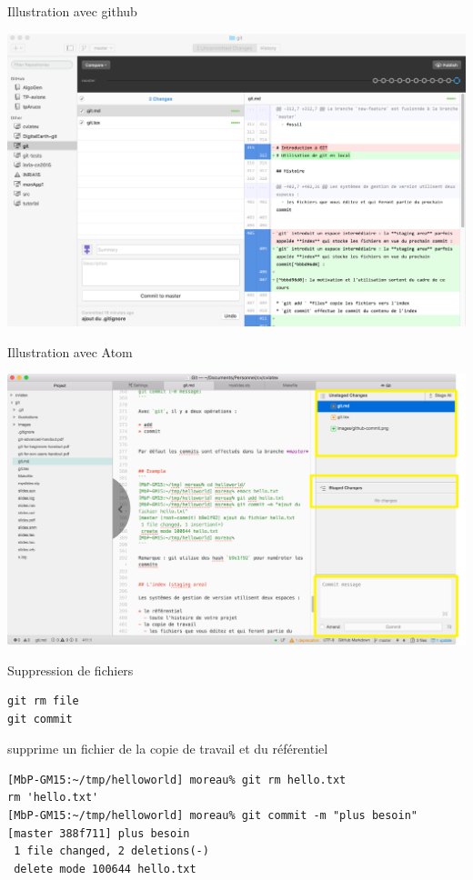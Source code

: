 \begin{frame}{%
\protect\hypertarget{illustration-avec-github}{%
Illustration avec github}}

\includegraphics[width=1\textwidth]{images/github-commit.png}

\end{frame}

\begin{frame}{%
\protect\hypertarget{illustration-avec-atom}{%
Illustration avec Atom}}

\includegraphics[width=1\textwidth]{images/atom-commit.png}

\end{frame}

\begin{frame}[fragile]{%
\protect\hypertarget{suppression-de-fichiers}{%
Suppression de fichiers}}

\begin{verbatim}
git rm file
git commit
\end{verbatim}

supprime un fichier de la copie de travail et du référentiel

\begin{verbatim}
[MbP-GM15:~/tmp/helloworld] moreau% git rm hello.txt
rm 'hello.txt'
[MbP-GM15:~/tmp/helloworld] moreau% git commit -m "plus besoin"
[master 388f711] plus besoin
 1 file changed, 2 deletions(-)
 delete mode 100644 hello.txt
\end{verbatim}

\end{frame}

